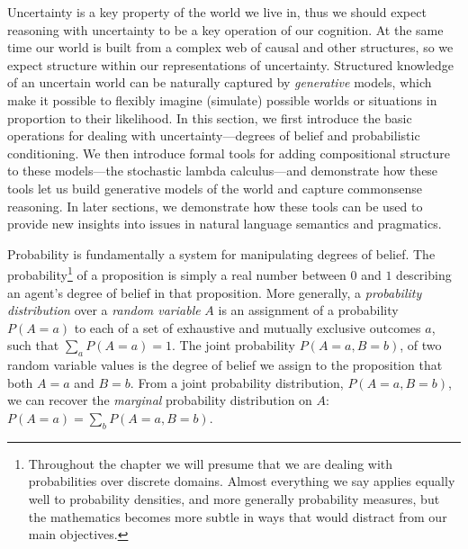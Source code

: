 \documentclass[pdfextras]{handbook}
\begin{document}
%  
  
 

Uncertainty is a key property of the world we live in, thus we should expect reasoning with uncertainty to be a key operation of our cognition. 
At the same time our world is built from a complex web of causal and other structures, so we expect structure within our representations of uncertainty. 
Structured knowledge of an uncertain world can be naturally captured by \emph{generative} models, which make it possible to flexibly imagine (simulate) possible worlds or situations in proportion to their likelihood. 
In this section, we first introduce the basic operations for dealing with uncertainty---degrees of belief and probabilistic conditioning. 
We then introduce formal tools for adding compositional structure to these models---the stochastic lambda calculus---and demonstrate how these tools let us build generative models of the world and capture commonsense reasoning. 
In later sections, we demonstrate how these tools can be used to provide new insights into issues in natural language semantics and pragmatics.

Probability is fundamentally a system for manipulating degrees of belief. 
The probability\footnote{Throughout the chapter we will presume that we are dealing with probabilities over discrete domains. Almost everything we say  applies equally well to probability densities, and more generally probability measures, but the mathematics becomes more subtle in ways that would distract from our main objectives.} of a proposition is simply a real number between $0$ and $1$ describing an agent's degree of belief in that proposition. 
More generally, a \emph{probability distribution} over a \emph{random variable} $A$ is an assignment of a probability $P(A{=}a)$ to each of a set of exhaustive and mutually exclusive outcomes $a$, such that $\sum_a P(A{=}a)=1$. 
The joint probability $P(A{=}a,B{=}b)$, of two random variable values is the degree of belief we assign to the proposition that both $A{=}a$ and $B{=}b$. From a joint probability distribution, $P(A{=}a,B{=}b)$, we can recover the \emph{marginal} probability distribution on $A$: $P(A{=}a) = \sum_b P(A{=}a,B{=}b)$.
\end{document}
